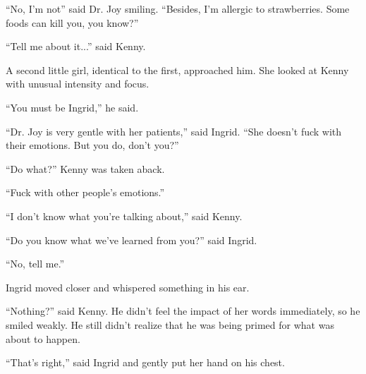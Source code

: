 \documentclass{memoir}
\begin{document}
``No, I'm not'' said Dr. Joy smiling. ``Besides, I'm allergic to strawberries. Some foods can kill you, you know?''

``Tell me about it...'' said Kenny.

A second little girl, identical to the first, approached him. She looked at Kenny with unusual intensity and focus.

``You must be Ingrid,'' he said.

``Dr. Joy is very gentle with her patients,'' said Ingrid. ``She doesn't fuck with their emotions. But you do, don't you?''

``Do what?'' Kenny was taken aback.

``Fuck with other people's emotions.''

``I don't know what you're talking about,'' said Kenny.

``Do you know what we've learned from you?'' said Ingrid. 

``No, tell me.''

Ingrid moved closer and whispered something in his ear. 

``Nothing?'' said Kenny. He didn't feel the impact of her words immediately, so he smiled weakly. He still didn't realize that he was being primed for what was about to happen.

``That's right,'' said Ingrid and gently put her hand on his chest. 
\end{document}
